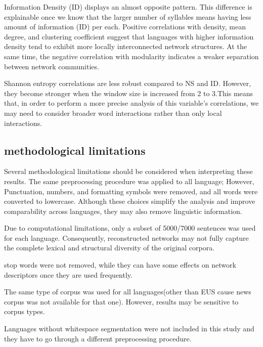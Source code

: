 \noindent
Information Density (ID) displays an almost opposite pattern. This difference is explainable once we know that the larger number of syllables means having less amount of information (ID) per each. Positive correlations with density, mean degree, and clustering coefficient suggest that languages with higher information density tend to exhibit more locally interconnected network structures. At the same time, the negative correlation with modularity indicates a weaker separation between network communities.

\noindent
Shannon entropy correlations are less robust compared to NS and ID. However, they become stronger when the window size is increased from 2 to 3.This means that, in order to perform a more precise analysis of this variable's correlations, we may need to consider broader word interactions rather than only local interactions. 

\subsection{methodological limitations}
Several methodological limitations should be considered when interpreting these results. 
The same preprocessing procedure was applied to all language; However,  Punctuation, numbers, and formatting symbols were removed, and all words were converted to lowercase. Although these choices simplify the analysis and improve comparability across languages, they may also remove linguistic information.

\noindent
Due to computational limitations, only a subset of 5000/7000 sentences was used for each language. Consequently, reconstructed networks may not fully capture the complete lexical and structural diversity of the original corpora.

\noindent
stop words were not removed, while they can have some effects on network descriptors once they are used frequently.

\noindent
The same type of corpus was used for all languages(other than EUS cause news corpus was not available for that one). However, results may be sensitive to corpus types.

\noindent
Languages without whitespace segmentation were not included in this study and they have to go through a different preprocessing procedure.





